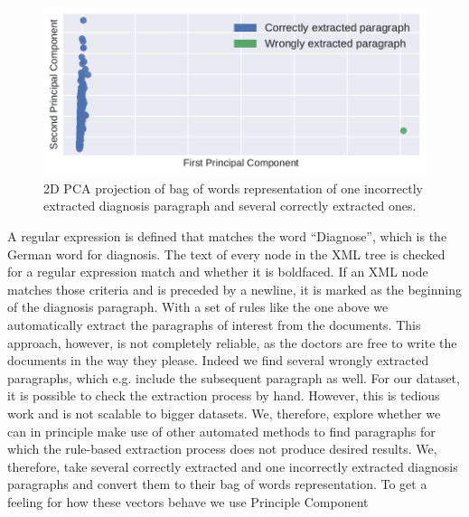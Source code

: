 
\bigskip
\begin{figure}
	\includegraphics[width=\linewidth]{figures/bow_find_odd}
	\caption{2D PCA projection of bag of words representation of one incorrectly extracted diagnosis paragraph and several correctly extracted ones.}
	\label{fig:bow_find_odd}
\end{figure}
A regular expression is defined that matches the word ``Diagnose'', which is the German word for diagnosis.
The text of every node in the XML tree is checked for a regular expression match and whether it is boldfaced. If an XML node matches those criteria and is preceded by a newline, it is marked as the beginning of the diagnosis paragraph.
With a set of rules like the one above we automatically extract the
paragraphs of interest from the documents. This approach, however,
is not completely reliable, as the doctors are free to write the documents
in the way they please. Indeed we find several wrongly extracted paragraphs,
which e.g. include the subsequent paragraph as well. For our dataset,
it is possible to check the extraction process by hand. However, this
is tedious work and is not scalable to bigger
datasets. We, therefore, explore whether we can in principle make use
of other automated methods to find paragraphs for which the rule-based extraction
process does not produce desired results. We, therefore, take several correctly extracted and one incorrectly extracted
diagnosis paragraphs and convert them to their bag of words representation.
To get a feeling for how these vectors behave we use Principle Component
